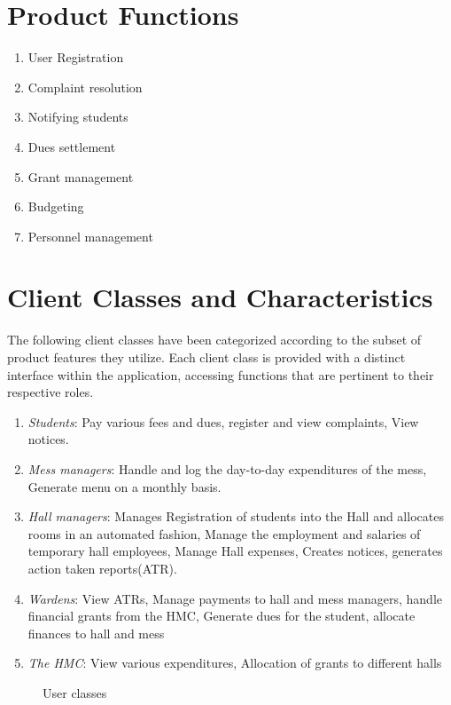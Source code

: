 \documentclass{scrreprt}
\begin{document}
\section{Product Functions}
\begin{enumerate}
    \item User Registration
    \item Complaint resolution
    \item Notifying students
    \item Dues settlement
    \item Grant management
    \item Budgeting
    \item Personnel management
\end{enumerate}
\section{Client Classes and Characteristics}
The following client classes have been categorized according to the subset of product features they utilize. Each client class is provided with a distinct interface within the application, accessing functions that are pertinent to their respective roles.
\begin{enumerate}
  \item \textit{Students}: Pay various fees and dues, register and view complaints, View notices.
  \item \textit{Mess managers}: Handle and log the day-to-day expenditures of the mess, Generate menu on a monthly basis.
  \item \textit{Hall managers}: Manages Registration of students into the Hall and allocates rooms in an automated fashion, Manage the employment and salaries of temporary hall employees, Manage Hall expenses, Creates notices, generates action taken reports(ATR). 
  \item \textit{Wardens}: View ATRs, Manage payments to hall and mess managers, handle financial grants from the HMC, Generate dues for the student, allocate finances to hall and mess
  \item \textit{The HMC}: View various expenditures, Allocation of grants to different halls  
\end{enumerate}
\begin{figure}
    \centering
    \caption{User classes}
    \label{fig:user_classes}
\end{figure}
\end{document}
